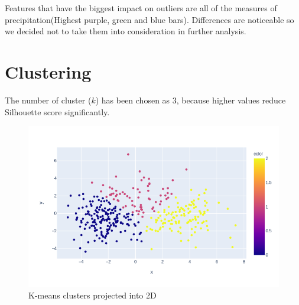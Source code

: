 \documentclass[sigconf]{acmart}
\begin{document}
Features that have the biggest impact on outliers are all of the measures of precipitation(Highest purple, green and blue bars). Differences are noticeable so we decided not to take them into consideration in further analysis.

\section{Clustering}
    The number of cluster ($k$) has been chosen as 3, because higher values reduce Silhouette score significantly.
    \begin{figure}[h]
    \includegraphics[width=\linewidth]{kmeans.png}
    \centering
    \caption{K-means clusters projected into 2D}
\end{figure}
\end{document}
